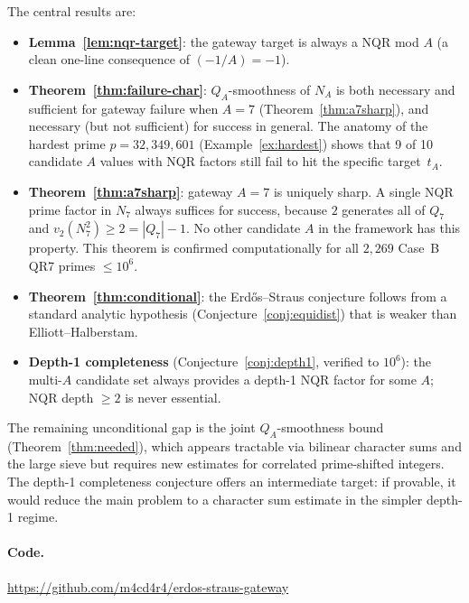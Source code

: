 \documentclass[12pt]{amsart}
\theoremstyle{definition}
\theoremstyle{remark}
\begin{document}
The central results are:
\begin{itemize}
\item \textbf{Lemma~\ref{lem:nqr-target}}: the gateway target is always
  a NQR mod $A$ (a clean one-line consequence of $(-1/A) = -1$).
\item \textbf{Theorem~\ref{thm:failure-char}}: $Q_A$-smoothness of $N_A$
  is both necessary and sufficient for gateway failure when $A = 7$
  (Theorem~\ref{thm:a7sharp}),
  and necessary (but not sufficient) for success in general.
  The anatomy of the hardest prime $p = 32{,}349{,}601$
  (Example~\ref{ex:hardest}) shows that 9 of 10 candidate $A$ values
  with NQR factors still fail to hit the specific target~$t_A$.
\item \textbf{Theorem~\ref{thm:a7sharp}}: gateway $A = 7$ is uniquely sharp.
  A single NQR prime factor in $N_7$ always suffices for success,
  because $2$ generates all of $Q_7$ and $v_2(N_7^2) \ge 2 = |Q_7| - 1$.
  No other candidate $A$ in the framework has this property.
  This theorem is confirmed computationally for all $2{,}269$
  Case~B QR7 primes $\le 10^6$.
\item \textbf{Theorem~\ref{thm:conditional}}: the Erd\H{o}s--Straus conjecture
  follows from a standard analytic hypothesis
  (Conjecture~\ref{conj:equidist}) that is weaker than Elliott--Halberstam.
\item \textbf{Depth-1 completeness} (Conjecture~\ref{conj:depth1}, verified to $10^6$):
  the multi-$A$ candidate set always provides a depth-1 NQR factor for some $A$;
  NQR depth $\ge 2$ is never essential.
\end{itemize}

The remaining unconditional gap is the joint $Q_A$-smoothness bound
(Theorem~\ref{thm:needed}), which appears tractable via bilinear
character sums and the large sieve but requires new estimates for
correlated prime-shifted integers.
The depth-1 completeness conjecture offers an intermediate target:
if provable, it would reduce the main problem to a character sum estimate
in the simpler depth-1 regime.

\paragraph{Code.}
\url{https://github.com/m4cd4r4/erdos-straus-gateway}
\end{document}
